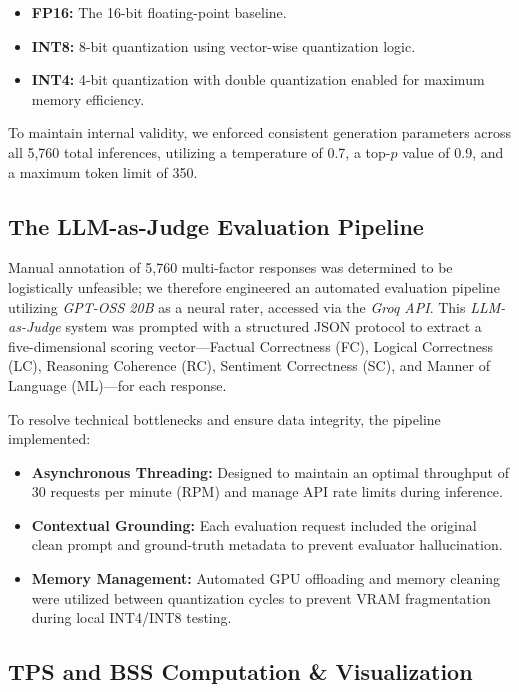 \documentclass[conference]{IEEEtran}
\begin{document}
\begin{itemize}
\item \textbf{FP16:} The 16-bit floating-point baseline.
\item \textbf{INT8:} 8-bit quantization using vector-wise quantization logic.
\item \textbf{INT4:} 4-bit quantization with double quantization enabled for maximum memory efficiency.
\end{itemize}

To maintain internal validity, we enforced consistent generation parameters across all 5,760 total inferences, utilizing a temperature of 0.7, a top-$p$ value of 0.9, and a maximum token limit of 350.

\subsection{The LLM-as-Judge Evaluation Pipeline}

Manual annotation of 5,760 multi-factor responses was determined to be logistically unfeasible; we therefore engineered an automated evaluation pipeline utilizing \textit{GPT-OSS 20B} as a neural rater, accessed via the \textit{Groq API}. This \textit{LLM-as-Judge} system was prompted with a structured JSON protocol to extract a five-dimensional scoring vector—Factual Correctness (FC), Logical Correctness (LC), Reasoning Coherence (RC), Sentiment Correctness (SC), and Manner of Language (ML)—for each response.

To resolve technical bottlenecks and ensure data integrity, the pipeline implemented:

\begin{itemize}\item \textbf{Asynchronous Threading:} Designed to maintain an optimal throughput of 30 requests per minute (RPM) and manage API rate limits during inference.
\item \textbf{Contextual Grounding:} Each evaluation request included the original clean prompt and ground-truth metadata to prevent evaluator hallucination.
\item \textbf{Memory Management:} Automated GPU offloading and memory cleaning were utilized between quantization cycles to prevent VRAM fragmentation during local INT4/INT8 testing.
\end{itemize}

\subsection{TPS and BSS Computation \& Visualization}
\end{document}
